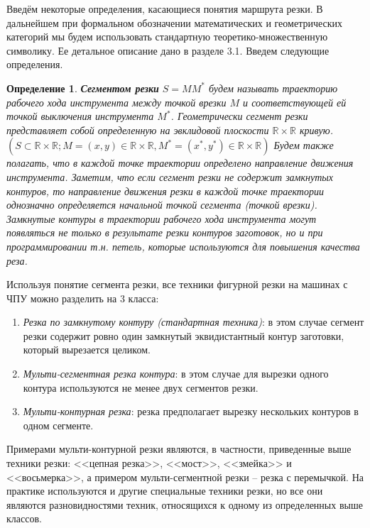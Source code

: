 \documentclass[11pt,twoside]{report}
\newcounter{theo}
\newcounter{pred}
\newcounter{opred}
\newtheorem{opred}{Определение}[section]
\begin{document}
Введём некоторые определения,
касающиеся понятия маршрута резки.
В дальнейшем при формальном обозначении
математических и геометрических категорий
мы будем использовать стандартную
теоретико-множественную символику.
Ее детальное описание дано в разделе 3.1.
Введем следующие определения.

\begin{opred}
\label{Opred1}
{\bf Сегментом резки}
$S=MM^*$
будем называть траекторию рабочего хода
инструмента между точкой врезки
$M$
и соответствующей ей точкой выключения инструмента
$M^*$.
Геометрически сегмент резки представляет собой
определенную на эвклидовой плоскости
$\mathbb R \times \mathbb R$
кривую.
$(S \subset \mathbb R \times \mathbb R;
M=(x,y) \in \mathbb R \times \mathbb R,
M^* =(x^*,y^*)\in \mathbb R \times \mathbb R)$
Будем также полагать,
что в каждой точке траектории определено направление движения инструмента.
Заметим, что если сегмент резки не содержит замкнутых контуров,
то направление движения резки в каждой точке траектории
однозначно определяется начальной точкой сегмента
(точкой врезки).
Замкнутые контуры в траектории рабочего хода инструмента
могут появляться не только в результате резки контуров заготовок,
но и при программировании т.н. петель,
которые используются для повышения качества реза.
\end{opred}

Используя понятие сегмента резки,
все техники фигурной резки на машинах с ЧПУ
можно разделить на 3 класса:
\begin{enumerate}
  \item
  {\it Резка по замкнутому контуру (стандартная техника)}:
  в этом случае сегмент резки содержит
  ровно один замкнутый эквидистантный контур заготовки,
  который вырезается целиком.
  \item
  {\it Мульти-сегментная резка контура}:
  в этом случае для вырезки одного контура
  используются не менее двух сегментов резки.
  \item
  {\it Мульти-контурная резка}:
  резка предполагает вырезку нескольких
  контуров в одном сегменте.
\end{enumerate}

Примерами мульти-контурной резки являются,
в частности, приведенные выше техники резки:
<<цепная резка>>, <<мост>>, <<змейка>> и <<восьмерка>>,
а примером мульти-сегментной резки –
резка с перемычкой.
На практике используются и другие специальные техники резки,
но все они являются разновидностями техник,
относящихся к одному из определенных выше классов.
\end{document}
